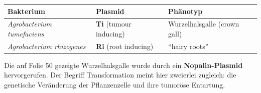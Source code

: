 \begin{mytable}
    \begin{tabular}{@{}lll@{}}
        \hline
        \textbf{Bakterium} & \textbf{Plasmid} & \textbf{Phänotyp} \\
        \hline
        \emph{Agrobacterium tumefaciens} & \textbf{Ti} (tumour inducing)
        & Wurzelhalsgalle (crown gall) \\
        \emph{Agrobacterium rhizogenes}  & \textbf{Ri} (root inducing)
        & ``hairy roots'' \\
        \hline
    \end{tabular}
\end{mytable}

\begin{bsp}
    Die auf Folie 50 gezeigte Wurzelhalsgalle wurde durch ein
    \textbf{Nopalin-Plasmid} hervorgerufen.
    Der Begriff Transformation
    meint hier zweierlei zugleich: die genetische Veränderung der Pflanzenzelle
    und ihre tumoröse Entartung.
\end{bsp}

